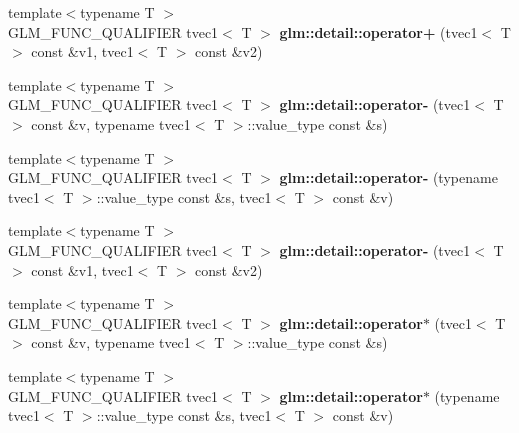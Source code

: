 \begin{DoxyCompactItemize}
\item 
\hypertarget{namespaceglm_1_1detail_a6145953121c50379992aba18340c58d3}{}{\footnotesize template$<$typename T $>$ }\\G\+L\+M\+\_\+\+F\+U\+N\+C\+\_\+\+Q\+U\+A\+L\+I\+F\+I\+E\+R tvec1$<$ T $>$ {\bfseries glm\+::detail\+::operator+} (tvec1$<$ T $>$ const \&v1, tvec1$<$ T $>$ const \&v2)\label{namespaceglm_1_1detail_a6145953121c50379992aba18340c58d3}

\item 
\hypertarget{namespaceglm_1_1detail_a0218e4cee708b6b91e48baa5bbea5954}{}{\footnotesize template$<$typename T $>$ }\\G\+L\+M\+\_\+\+F\+U\+N\+C\+\_\+\+Q\+U\+A\+L\+I\+F\+I\+E\+R tvec1$<$ T $>$ {\bfseries glm\+::detail\+::operator-\/} (tvec1$<$ T $>$ const \&v, typename tvec1$<$ T $>$\+::value\+\_\+type const \&s)\label{namespaceglm_1_1detail_a0218e4cee708b6b91e48baa5bbea5954}

\item 
\hypertarget{namespaceglm_1_1detail_abfb3bb0f7c5149426afe27f823a7d7fa}{}{\footnotesize template$<$typename T $>$ }\\G\+L\+M\+\_\+\+F\+U\+N\+C\+\_\+\+Q\+U\+A\+L\+I\+F\+I\+E\+R tvec1$<$ T $>$ {\bfseries glm\+::detail\+::operator-\/} (typename tvec1$<$ T $>$\+::value\+\_\+type const \&s, tvec1$<$ T $>$ const \&v)\label{namespaceglm_1_1detail_abfb3bb0f7c5149426afe27f823a7d7fa}

\item 
\hypertarget{namespaceglm_1_1detail_a3343759099fcd3eda38f3faf618aeca8}{}{\footnotesize template$<$typename T $>$ }\\G\+L\+M\+\_\+\+F\+U\+N\+C\+\_\+\+Q\+U\+A\+L\+I\+F\+I\+E\+R tvec1$<$ T $>$ {\bfseries glm\+::detail\+::operator-\/} (tvec1$<$ T $>$ const \&v1, tvec1$<$ T $>$ const \&v2)\label{namespaceglm_1_1detail_a3343759099fcd3eda38f3faf618aeca8}

\item 
\hypertarget{namespaceglm_1_1detail_a4d99f64025983c46ebe26b241202369f}{}{\footnotesize template$<$typename T $>$ }\\G\+L\+M\+\_\+\+F\+U\+N\+C\+\_\+\+Q\+U\+A\+L\+I\+F\+I\+E\+R tvec1$<$ T $>$ {\bfseries glm\+::detail\+::operator$\ast$} (tvec1$<$ T $>$ const \&v, typename tvec1$<$ T $>$\+::value\+\_\+type const \&s)\label{namespaceglm_1_1detail_a4d99f64025983c46ebe26b241202369f}

\item 
\hypertarget{namespaceglm_1_1detail_a46da341cfc3cfd768914e7270ff6da80}{}{\footnotesize template$<$typename T $>$ }\\G\+L\+M\+\_\+\+F\+U\+N\+C\+\_\+\+Q\+U\+A\+L\+I\+F\+I\+E\+R tvec1$<$ T $>$ {\bfseries glm\+::detail\+::operator$\ast$} (typename tvec1$<$ T $>$\+::value\+\_\+type const \&s, tvec1$<$ T $>$ const \&v)\label{namespaceglm_1_1detail_a46da341cfc3cfd768914e7270ff6da80}


\end{DoxyCompactItemize}
